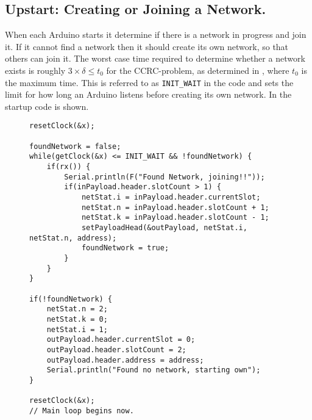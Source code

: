 \subsection{Upstart: Creating or Joining a Network.}
When each Arduino starts it determine if there is a network in progress and join it. 
If it cannot find a network then it should create its own network, so that others can join it. 
The worst case time required to determine whether a network exists is roughly $3 \times \delta \leq t_0$ for the CCRC-problem, as determined in , where $t_0$ is the maximum time. 
This is referred to as \texttt{INIT\_WAIT} in the code and sets the limit for how long an Arduino listens before creating its own network. 
In  the startup code is shown. 
\begin{figure}
\begin{lstlisting}[style=customc,caption={Startup, if a network is found join it, if not create one.},label={lst:ccrc:startup}]
resetClock(&x);

foundNetwork = false;
while(getClock(&x) <= INIT_WAIT && !foundNetwork) {
    if(rx()) {
        Serial.println(F("Found Network, joining!!"));
        if(inPayload.header.slotCount > 1) {
            netStat.i = inPayload.header.currentSlot;
            netStat.n = inPayload.header.slotCount + 1;
            netStat.k = inPayload.header.slotCount - 1;
            setPayloadHead(&outPayload, netStat.i,  netStat.n, address);
            foundNetwork = true;
        }
    }
}

if(!foundNetwork) {
    netStat.n = 2;
    netStat.k = 0;
    netStat.i = 1; 
    outPayload.header.currentSlot = 0;
    outPayload.header.slotCount = 2;
    outPayload.header.address = address;
    Serial.println("Found no network, starting own");
}

resetClock(&x);
// Main loop begins now.
\end{lstlisting}
\end{figure}
